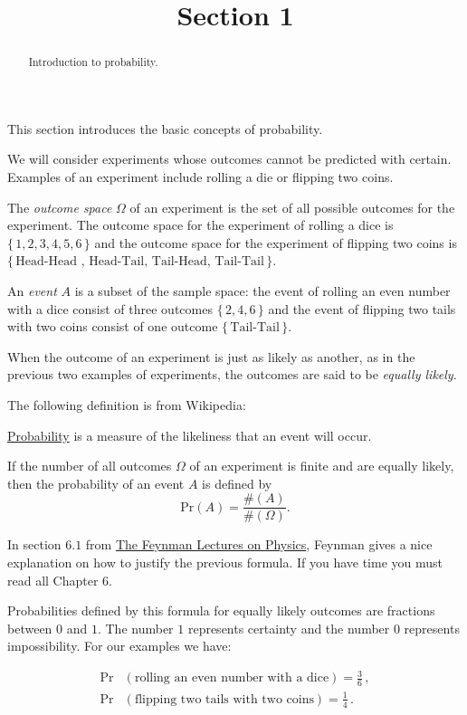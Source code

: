 \documentclass{ximera}
\title{Section 1}
\begin{document}
\begin{abstract}
Introduction to probability.
\end{abstract}
\maketitle

This section introduces the basic concepts of probability. \vspace{.25cm}

We will consider experiments whose outcomes cannot be predicted with certain. Examples of an experiment include rolling a die or flipping two coins.

The {\it outcome space} $\Omega$ of an experiment is the set of all possible outcomes for the experiment. The outcome space for the experiment of rolling a dice is $\{\,1,2,3,4,5,6\,\}$ and the outcome space for the experiment of flipping two coins is $\{\, \text{Head-Head , Head-Tail, Tail-Head, Tail-Tail} \,\}$.

An {\it event} $A$ is a subset of the sample space: the event of rolling an even number with a dice consist of three outcomes $\{\,2,4,6\,\}$ and the event of flipping two tails with two coins consist of one outcome $\{\, \text{Tail-Tail} \,\}$. 

When the outcome of an experiment is just as likely as another, as in the previous two examples of experiments, the outcomes are said to be {\it equally likely}. \vspace{.25cm}

The following definition is from Wikipedia: 

\href{http://en.wikipedia.org/wiki/Probability}{Probability} is a measure of the likeliness that an event will occur. \vspace{.25cm}

If the number of all outcomes $\Omega$ of an experiment is finite and are equally likely, then the probability of an event $A$ is defined by
\[
\text{Pr}(A) = \frac{ \#(A) }{ \#(\Omega)}.
\]

In section $6.1$ from \href{ http://www.feynmanlectures.caltech.edu/I_06.html#Ch6-S1}{The Feynman Lectures on Physics}, Feynman gives a nice explanation on how to justify the previous formula. If you have time you must read all Chapter $6$. \vspace{.25cm}

Probabilities defined by this formula for equally likely outcomes are fractions between $0$ and $1$. The number $1$ represents certainty and the number $0$ represents impossibility. 
For our examples we have:

\begin{align*}
\text{Pr}&( \text{rolling an even number with a dice} ) = \frac{3}{6}\,,  \\
\text{Pr}&( \text{flipping two tails with two coins} ) = \frac{1}{4}\,.
\end{align*}
\end{document}
